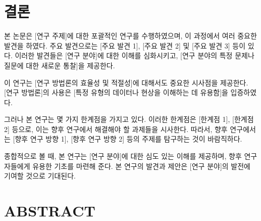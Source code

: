 \documentclass[a4paper,11pt]{article}
\begin{document}
\newpage   
\clearpage %

\section{결론}
본 논문은 [연구 주제]에 대한 포괄적인 연구를 수행하였으며, 이 과정에서 여러 중요한 발견을 하였다. 
주요 발견으로는 [주요 발견 1], [주요 발견 2] 및 [주요 발견 3] 등이 있다. 
이러한 발견들은 [연구 분야]에 대한 이해를 심화시키고, [연구 분야의 특정 문제나 질문에 대한 새로운 통찰]을 제공한다.

이 연구는 [연구 방법론의 효율성 및 적절성]에 대해서도 중요한 시사점을 제공한다. 
[연구 방법론]의 사용은 [특정 유형의 데이터나 현상을 이해하는 데 유용함]을 입증하였다.

그러나 본 연구는 몇 가지 한계점을 가지고 있다.
이러한 한계점은 [한계점 1], [한계점 2] 등으로, 이는 향후 연구에서 해결해야 할 과제들을 시사한다. 
따라서, 향후 연구에서는 [향후 연구 방향 1], [향후 연구 방향 2] 등의 주제를 탐구하는 것이 바람직하다.

종합적으로 볼 때, 본 연구는 [연구 분야]에 대한 심도 있는 이해를 제공하며, 향후 연구자들에게 유용한 기초를 마련해 준다. 
본 연구의 발견과 제안은 [연구 분야]의 발전에 기여할 것으로 기대된다.


\newpage 




\newpage
\section*{\centering ABSTRACT}
\subsection*{}
\end{document}
